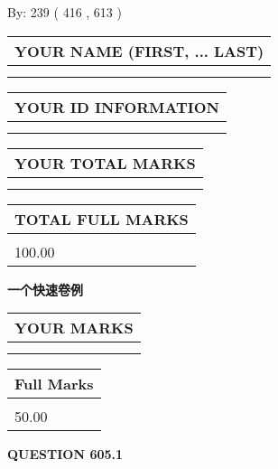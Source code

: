\documentclass{ctexart}
\begin{document}
   
\hspace{1.0in} By: 
 239 ( 416 ,  613 )
   
   
   
   
\newpage 
\setcounter{page}{ 
   605001 } 
   
   
   
   
\noindent\begin{tabular}{|l|}
\hline
YOUR NAME (FIRST, ... LAST)  \\
\hline
 \\ 
 \\ 
\hline
\end{tabular}
\hspace{0.05in} \begin{tabular}{|l|}
\hline
 YOUR   ID   INFORMATION  \\
\hline
 \\ 
 \\ 
\hline
\end{tabular}
   
   
\vspace{0.2in}\noindent\begin{tabular}{|l|}
\hline
YOUR TOTAL MARKS  \\
\hline
 \\ 
 \\ 
\hline
\end{tabular}
\hspace{0.05in} \begin{tabular}{|l|}
\hline
TOTAL FULL MARKS  \\
\hline
 \\ 
100.00 \\
\hline
\end{tabular}
   
   
 \vspace{0.2in}
{\LARGE {\textbf{ 一个快速卷例}}}
   
   
  
\vspace{0.2in}
  
\noindent\begin{tabular}{|l|}
\hline
 YOUR MARKS  \\
\hline
 \\ 
 \\ 
\hline
\end{tabular}
\hspace{0.05in} \begin{tabular}{|l|}
\hline
 Full Marks  \\
\hline
 \\ 
50.00 \\
\hline
\end{tabular}
{\textbf{\Large{QUESTION
605.1 
}}}
  
\end{document}

